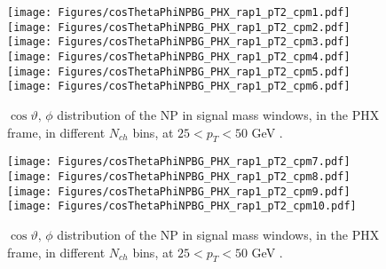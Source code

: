 \documentclass[12pt]{article}
\begin{document}
\begin{figure}[htbp]
\centering
\texttt{[image: Figures/cosThetaPhiNPBG\_PHX\_rap1\_pT2\_cpm1.pdf]}
\texttt{[image: Figures/cosThetaPhiNPBG\_PHX\_rap1\_pT2\_cpm2.pdf]}
\texttt{[image: Figures/cosThetaPhiNPBG\_PHX\_rap1\_pT2\_cpm3.pdf]}
\texttt{[image: Figures/cosThetaPhiNPBG\_PHX\_rap1\_pT2\_cpm4.pdf]}
\texttt{[image: Figures/cosThetaPhiNPBG\_PHX\_rap1\_pT2\_cpm5.pdf]}
\texttt{[image: Figures/cosThetaPhiNPBG\_PHX\_rap1\_pT2\_cpm6.pdf]}
\caption{$\cos\vartheta,\,\phi$ distribution of the NP in signal mass windows, 
	in the PHX frame, in different $N_{ch}$ bins, at $25 < p_{T} < 50$ GeV .}
\end{figure}
\clearpage

\begin{figure}[htbp]
\centering
\texttt{[image: Figures/cosThetaPhiNPBG\_PHX\_rap1\_pT2\_cpm7.pdf]}
\texttt{[image: Figures/cosThetaPhiNPBG\_PHX\_rap1\_pT2\_cpm8.pdf]}
\texttt{[image: Figures/cosThetaPhiNPBG\_PHX\_rap1\_pT2\_cpm9.pdf]}
\texttt{[image: Figures/cosThetaPhiNPBG\_PHX\_rap1\_pT2\_cpm10.pdf]}
\caption{$\cos\vartheta,\,\phi$ distribution of the NP in signal mass windows, 
	in the PHX frame, in different $N_{ch}$ bins, at $25 < p_{T} < 50$ GeV .}
\end{figure}
\clearpage
\end{document}
